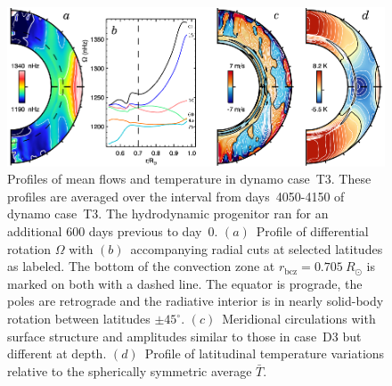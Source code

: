 \clearpage
\begin{figure}[!t]
  \begin{center}
    \includegraphics{figs/chapter_9/case_T3_mean_flows.eps}
  \end{center}
  \caption[Profiles of mean flows and temperature in dynamo case~T3]
          {Profiles of mean flows and temperature in dynamo case~T3.
            These profiles are averaged over the interval from
            days~4050-4150 of dynamo case~T3.  The hydrodynamic
            progenitor ran for an additional 600 days previous to day~0.
            $(a)$~Profile of differential rotation
            $\Omega$ with $(b)$~accompanying radial cuts at selected
            latitudes as labeled.  The bottom
            of the convection zone at $r_\mathrm{bcz}=0.705\:R_\odot$
            is marked on both with a dashed line.  The equator is
            prograde, the poles are retrograde and the radiative
            interior is in nearly solid-body rotation between
            latitudes $\pm45^\circ$.
            $(c)$~Meridional circulations with surface structure and
            amplitudes similar to those in case~D3 but different at
            depth.  $(d)$~Profile of latitudinal temperature
            variations relative to the spherically symmetric average $\bar{T}$.
            \label{fig:T3 mean flows}}
          \vskip-0.5cm
\end{figure}

